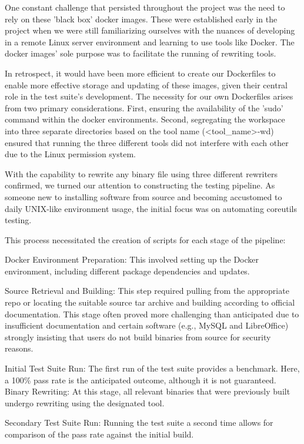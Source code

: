 \documentclass[a4paper,11pt,oneside]{report}
\begin{document}
One constant challenge that persisted throughout the project was the need to rely
on these 'black box' docker images. These were established early in the project when we
were still familiarizing ourselves with the nuances of developing in a remote Linux server
environment and learning to use tools like Docker. The docker images' sole purpose was to
facilitate the running of rewriting tools.

In retrospect, it would have been more efficient to create our Dockerfiles to enable
more effective storage and updating of these images, given their central role in the test
suite's development. The necessity for our own Dockerfiles arises from two primary
considerations. First, ensuring the availability of the 'sudo' command within the docker
environments. Second, segregating the workspace into three separate directories based on
the tool name (\textless{}tool\_name\textgreater{}-wd) ensured that running the three different tools did not
interfere with each other due to the Linux permission system.

With the capability to rewrite any binary file using three different rewriters
confirmed, we turned our attention to constructing the testing pipeline. As someone new to
installing software from source and becoming accustomed to daily UNIX-like environment
usage, the initial focus was on automating coreutils testing.

This process necessitated the creation of scripts for each stage of the pipeline:

Docker Environment Preparation: This involved setting up the Docker environment,
including different package dependencies and updates.

Source Retrieval and Building: This step required pulling from the appropriate repo
or locating the suitable source tar archive and building according to official documentation.
This stage often proved more challenging than anticipated due to insufficient
documentation and certain software (e.g., MySQL and LibreOffice) strongly insisting that
users do not build binaries from source for security reasons.

Initial Test Suite Run: The first run of the test suite provides a benchmark. Here, a
100\% pass rate is the anticipated outcome, although it is not guaranteed.
Binary Rewriting: At this stage, all relevant binaries that were previously built
undergo rewriting using the designated tool.

Secondary Test Suite Run: Running the test suite a second time allows for
comparison of the pass rate against the initial build.
\end{document}
